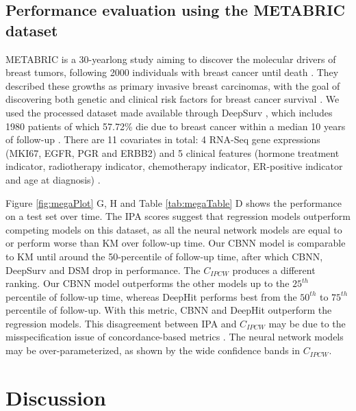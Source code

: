 \documentclass[AMA,STIX1COL,]{WileyNJD-v2}
\begin{document}
\hypertarget{performance-evaluation-using-the-metabric-dataset}{%
\subsection{Performance evaluation using the METABRIC
dataset}\label{performance-evaluation-using-the-metabric-dataset}}

METABRIC is a 30-yearlong study aiming to discover the molecular drivers
of breast tumors, following 2000 individuals with breast cancer until
death \citep{curtis2012genomic}. They described these growths as primary
invasive breast carcinomas, with the goal of discovering both genetic
and clinical risk factors for breast cancer survival
\citep{curtis2012genomic}. We used the processed dataset made available
through DeepSurv \citep{katzman2018DeepSurv}, which includes 1980
patients of which 57.72\% die due to breast cancer within a median 10
years of follow-up \citep{katzman2018DeepSurv}. There are 11 covariates
in total: 4 RNA-Seq gene expressions (MKI67, EGFR, PGR and ERBB2) and 5
clinical features (hormone treatment indicator, radiotherapy indicator,
chemotherapy indicator, ER-positive indicator and age at diagnosis)
\citep{katzman2018DeepSurv}.

Figure \ref{fig:megaPlot} G, H and Table \ref{tab:megaTable} D shows the
performance on a test set over time. The IPA scores suggest that
regression models outperform competing models on this dataset, as all
the neural network models are equal to or perform worse than KM over
follow-up time. Our CBNN model is comparable to KM until around the
50-percentile of follow-up time, after which CBNN, DeepSurv and DSM drop
in performance. The \(C_{IPCW}\) produces a different ranking. Our CBNN
model outperforms the other models up to the \(25^{th}\) percentile of
follow-up time, whereas DeepHit performs best from the \(50^{th}\) to
\(75^{th}\) percentile of follow-up. With this metric, CBNN and DeepHit
outperform the regression models. This disagreement between IPA and
\(C_{IPCW}\) may be due to the misspecification issue of
concordance-based metrics \citep{cindexfails2019}. The neural network
models may be over-parameterized, as shown by the wide confidence bands
in \(C_{IPCW}\).

\hypertarget{discussion}{%
\section{Discussion}\label{discussion}}
\end{document}
